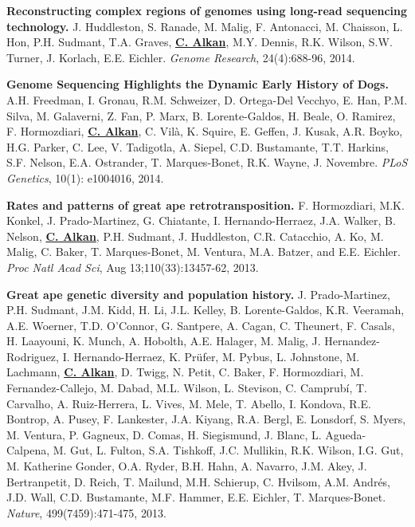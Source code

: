  \vspace{-.2cm}        
        {\bf Reconstructing complex regions of genomes using long-read sequencing technology.}
         J. Huddleston, S. Ranade, M. Malig, F. Antonacci, M. Chaisson, L. Hon, P.H. Sudmant, T.A. Graves, 
         {\bf {\underline{C. Alkan}}}, M.Y. Dennis, R.K. Wilson, S.W. Turner, J. Korlach, E.E. Eichler. 
         {\em Genome Research},  24(4):688-96, 2014.

 \vspace{-.2cm}        
        {\bf Genome Sequencing Highlights the Dynamic Early History of Dogs.}
        A.H. Freedman, I. Gronau, R.M. Schweizer, D. Ortega-Del Vecchyo, E. Han, P.M. Silva, M. Galaverni, Z. Fan, P. Marx, B. Lorente-Galdos, H. Beale, O. Ramirez, F. Hormozdiari, 
        {\bf {\underline{C. Alkan}}}, C. Vilà, K. Squire, E. Geffen, J. Kusak, A.R. Boyko, H.G. Parker, C. Lee, V. Tadigotla, A. Siepel, C.D. Bustamante, T.T. Harkins, 
        S.F. Nelson, E.A. Ostrander, T. Marques-Bonet, R.K. Wayne, J. Novembre. 
        {\em PLoS Genetics}, 10(1): e1004016, 2014.


 \vspace{-.2cm}        
        {\bf Rates and patterns of great ape retrotransposition.}
        F. Hormozdiari, M.K. Konkel, J. Prado-Martinez, G. Chiatante, I. Hernando-Herraez, J.A. Walker, B. Nelson, {\bf {\underline {C. Alkan}}}, P.H. Sudmant, J. Huddleston, C.R. Catacchio, A. Ko, 
        M. Malig, C. Baker, T. Marques-Bonet, M. Ventura, M.A. Batzer, and E.E. Eichler. 
        {\em Proc Natl Acad Sci}, Aug 13;110(33):13457-62, 2013.
                             

 \vspace{-.2cm}
        {\bf Great ape genetic diversity and population history.}
        J. Prado-Martinez, P.H. Sudmant, J.M. Kidd, H. Li, J.L. Kelley, B. Lorente-Galdos, K.R. Veeramah, A.E. Woerner, T.D. O’Connor, G. Santpere, A. Cagan, C. Theunert, F. Casals, H. Laayouni, K. Munch, A. Hobolth, A.E. Halager, M. Malig, J. Hernandez-Rodriguez, I. Hernando-Herraez, K. Prüfer, M. Pybus, L. Johnstone, M. Lachmann, {\bf {\underline {C. Alkan}}}, D. Twigg, N. Petit, C. Baker, F. Hormozdiari, M. Fernandez-Callejo, M. Dabad, M.L. Wilson, L. Stevison, C. Camprubí, T. Carvalho, A. Ruiz-Herrera, L. Vives, M. Mele, T. Abello, I. Kondova, R.E. Bontrop, A. Pusey, F. Lankester, J.A. Kiyang, R.A. Bergl, E. Lonsdorf, S. Myers, M. Ventura, P. Gagneux, D. Comas, H. Siegismund, J. Blanc, L. Agueda-Calpena, M. Gut, L. Fulton, S.A. Tishkoff, J.C. Mullikin, R.K. Wilson, I.G. Gut, M. Katherine Gonder, O.A. Ryder, B.H. Hahn, A. Navarro, J.M. Akey, J. Bertranpetit, D. Reich, T. Mailund, M.H. Schierup, C. Hvilsom, A.M. Andrés, J.D. Wall, C.D. Bustamante, M.F. Hammer, E.E. Eichler, T. Marques-Bonet. 
        {\em Nature}, 499(7459):471-475, 2013.

